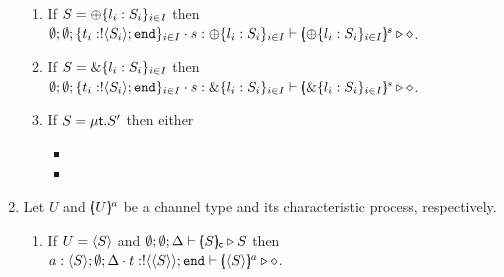 \begin{proposition}
\begin{enumerate}
\begin{enumerate}
			\item	If $S = \oplus \{l_i: S_i\}_{i \in I}$ then \\
					$\emptyset; \emptyset; \{t_i: ! \langle S_i \rangle ; \mathtt{end}\}_{i \in I} \cdot s: \oplus \{l_i: S_i\}_{i \in I} \vdash [\!\!(\oplus \{l_i: S_i\}_{i \in I})\!\!]^{s} \triangleright \diamond$.
	
			\item	If $S = \& \{l_i: S_i\}_{i \in I}$ then \\
					$\emptyset; \emptyset; \{t_i: ! \langle S_i \rangle ; \mathtt{end}\}_{i \in I} \cdot s: \& \{l_i: S_i\}_{i \in I} \vdash [\!\!(\& \{l_i: S_i\}_{i \in I})\!\!]^{s} \triangleright \diamond $.
	
			\item	If $S = \mu\mathsf{t}.S'$ then either
					\begin{itemize}
%

						\item {}

						\item {}
						
						
					\end{itemize}
			\end{enumerate}

		\item	Let $U$ and $[\!\!(U)\!\!]^{a}$  be a channel type and its characteristic process, respectively.
		\begin{enumerate}
			\item	If $U = \langle S \rangle$ and $\emptyset; \emptyset; \Delta \vdash [\!\!(S)\!\!]_{\mathsf{c}} \triangleright S$ then \\
					$a: \langle S \rangle; \emptyset; \Delta \cdot t: ! \langle \langle S \rangle \rangle ; \mathtt{end} \vdash [\!\!(\langle S \rangle)\!\!]^{a} \triangleright \diamond$.
	

\end{enumerate}
\end{enumerate}
\end{proposition}
